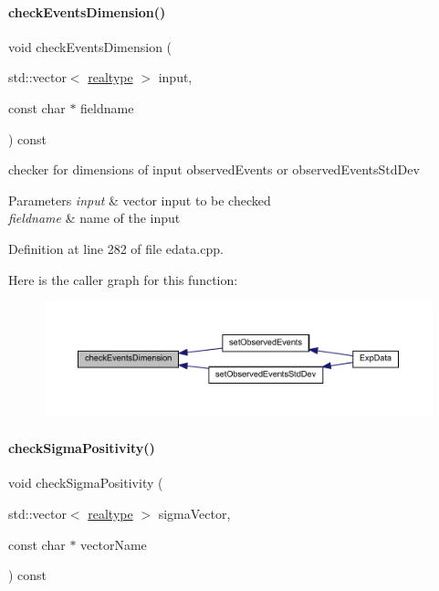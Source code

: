 \paragraph{\texorpdfstring{check\+Events\+Dimension()}{checkEventsDimension()}}
{\footnotesize\ttfamily void check\+Events\+Dimension (\begin{DoxyParamCaption}\item[{std\+::vector$<$ \mbox{\hyperlink{namespaceamici_a1bdce28051d6a53868f7ccbf5f2c14a3}{realtype}} $>$}]{input,  }\item[{const char $\ast$}]{fieldname }\end{DoxyParamCaption}) const\hspace{0.3cm}{\ttfamily [protected]}}

checker for dimensions of input observed\+Events or observed\+Events\+Std\+Dev


\begin{DoxyParams}{Parameters}
{\em input} & vector input to be checked \\
\hline
{\em fieldname} & name of the input \\
\hline
\end{DoxyParams}


Definition at line 282 of file edata.\+cpp.

Here is the caller graph for this function\+:
\nopagebreak
\begin{figure}[H]
\begin{center}
\leavevmode
\includegraphics[width=350pt]{classamici_1_1_exp_data_adcf5587f972fdef595fff78123f5118a_icgraph}
\end{center}
\end{figure}
\mbox{\label{classamici_1_1_exp_data_a30d756faaf9ea395446fbc5c65a7b125}} 
\paragraph{\texorpdfstring{check\+Sigma\+Positivity()}{checkSigmaPositivity()}\hspace{0.1cm}{\footnotesize\ttfamily [1/2]}}
{\footnotesize\ttfamily void check\+Sigma\+Positivity (\begin{DoxyParamCaption}\item[{std\+::vector$<$ \mbox{\hyperlink{namespaceamici_a1bdce28051d6a53868f7ccbf5f2c14a3}{realtype}} $>$}]{sigma\+Vector,  }\item[{const char $\ast$}]{vector\+Name }\end{DoxyParamCaption}) const\hspace{0.3cm}{\ttfamily [protected]}}

